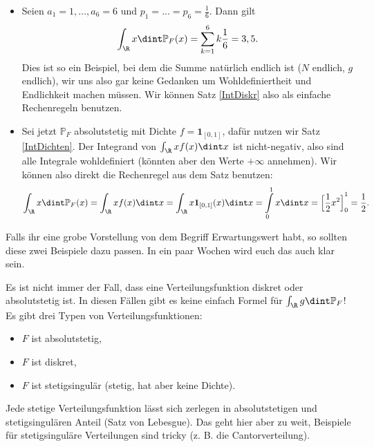 \begin{beispiel} \abs

	\begin{itemize}
		\item Seien $a_1=1, ..., a_6=6$ und $p_1=...=p_6=\frac 1 6$. Dann gilt \[ \int_{\R} x \dint \mathbb{P}_F(x) = \sum\limits_{k = 1}^{6}k  \frac{1}{6} = 3,5. \] Dies ist so ein Beispiel, bei dem die Summe nat\"urlich endlich ist ($N$ endlich, $g$ endlich), wir uns also gar keine Gedanken um Wohldefiniertheit und Endlichkeit machen m\"ussen. Wir k\"onnen Satz \ref{IntDiskr} also als einfache Rechenregeln benutzen.
		\item Sei jetzt $\mathbb{P}_F$ absolutstetig mit Dichte $f = \mathbf{1}_{[0,1]}$, daf\"ur nutzen wir Satz \ref{IntDichten}. Der Integrand von $\int_\R x f(x)\dint x$ ist nicht-negativ, also sind alle Integrale wohldefiniert (k\"onnten aber den Werte $+\infty$ annehmen). Wir k\"onnen also direkt die Rechenregel aus dem Satz benutzen:
		\[  \int_{\R} x \dint \mathbb{P}_F(x)=\int_{\R} x f(x) \dint x = \int_{\R} x \mathbf{1}_{[0,1]}(x) \dint x = \int\limits_{0}^1	x \dint x = {\Big[ \frac{1}{2} x^2\Big]}_{0}^{1} = \frac{1}{2}.\]
	\end{itemize}
	Falls ihr eine grobe Vorstellung von dem Begriff Erwartungswert habt, so sollten diese zwei Beispiele dazu passen. In ein paar Wochen wird euch das auch klar sein.
\end{beispiel}

\begin{warnung}
	Es ist nicht immer der Fall, dass eine Verteilungsfunktion diskret oder absolutstetig ist. In diesen F\"allen gibt es keine einfach Formel für $\int_{\R} g \dint \mathbb{P}_F$! Es gibt drei Typen von Verteilungsfunktionen:
	\begin{itemize}
		\item $F$ ist absolutstetig,
		\item $F$ ist diskret,
		\item $F$ ist \glqq stetigsingul\"ar\grqq{} (stetig, hat aber keine Dichte).
\end{itemize}
Jede stetige Verteilungsfunktion l\"asst sich zerlegen in absolutstetigen und stetigsingul\"aren Anteil (Satz von Lebesgue). Das geht hier aber zu weit, Beispiele f\"ur stetigsingul\"are Verteilungen sind tricky (z. B. die Cantorverteilung).
\end{warnung}


